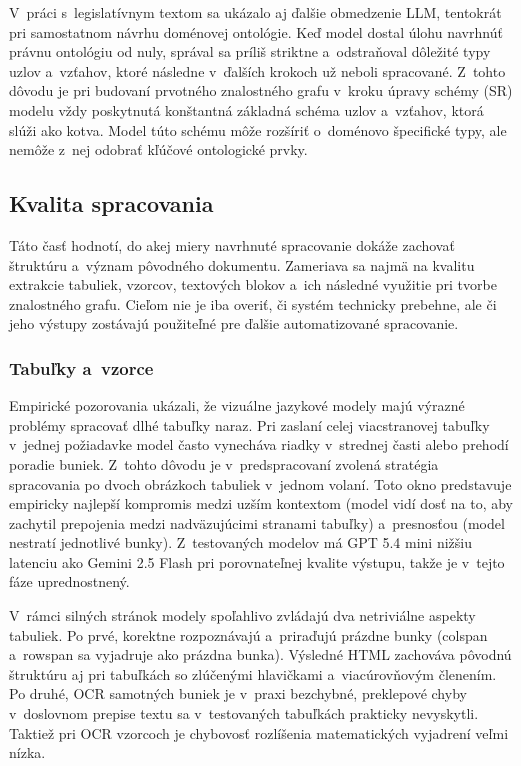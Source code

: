 V~práci s~legislatívnym textom sa ukázalo aj ďalšie obmedzenie LLM, tentokrát pri samostatnom návrhu doménovej ontológie. Keď model dostal úlohu navrhnúť právnu ontológiu od nuly, správal sa príliš striktne a~odstraňoval dôležité typy uzlov a~vzťahov, ktoré následne v~ďalších krokoch už neboli spracované. Z~tohto dôvodu je pri budovaní prvotného znalostného grafu v~kroku úpravy schémy (SR) modelu vždy poskytnutá konštantná základná schéma uzlov a~vzťahov, ktorá slúži ako kotva. Model túto schému môže rozšíriť o~doménovo špecifické typy, ale nemôže z~nej odobrať kľúčové ontologické prvky.



\subsection{Kvalita spracovania}
Táto časť hodnotí, do akej miery navrhnuté spracovanie dokáže zachovať štruktúru a~význam pôvodného dokumentu. Zameriava sa najmä na kvalitu extrakcie tabuliek, vzorcov, textových blokov a~ich následné využitie pri tvorbe znalostného grafu. Cieľom nie je iba overiť, či systém technicky prebehne, ale či jeho výstupy zostávajú použiteľné pre ďalšie automatizované spracovanie.

\subsubsection{Tabuľky a~vzorce}
Empirické pozorovania ukázali, že vizuálne jazykové modely majú výrazné problémy spracovať dlhé tabuľky naraz. Pri zaslaní celej viacstranovej tabuľky v~jednej požiadavke model často vynecháva riadky v~strednej časti alebo prehodí poradie buniek. Z~tohto dôvodu je v~predspracovaní zvolená stratégia spracovania po dvoch obrázkoch tabuliek v~jednom volaní. Toto okno predstavuje empiricky najlepší kompromis medzi uzším kontextom (model vidí dosť na to, aby zachytil prepojenia medzi nadväzujúcimi stranami tabuľky) a~presnosťou (model nestratí jednotlivé bunky). Z~testovaných modelov má GPT 5.4 mini nižšiu latenciu ako Gemini 2.5 Flash pri porovnateľnej kvalite výstupu, takže je v~tejto fáze uprednostnený.

V~rámci silných stránok modely spoľahlivo zvládajú dva netriviálne aspekty tabuliek. Po prvé, korektne rozpoznávajú a~priraďujú prázdne bunky (colspan a~rowspan sa vyjadruje ako prázdna bunka). Výsledné HTML zachováva pôvodnú štruktúru aj pri tabuľkách so zlúčenými hlavičkami a~viacúrovňovým členením. Po druhé, OCR samotných buniek je v~praxi bezchybné, preklepové chyby v~doslovnom prepise textu sa v~testovaných tabuľkách prakticky nevyskytli. Taktiež pri OCR vzorcoch je chybovosť rozlíšenia matematických vyjadrení veľmi nízka.


